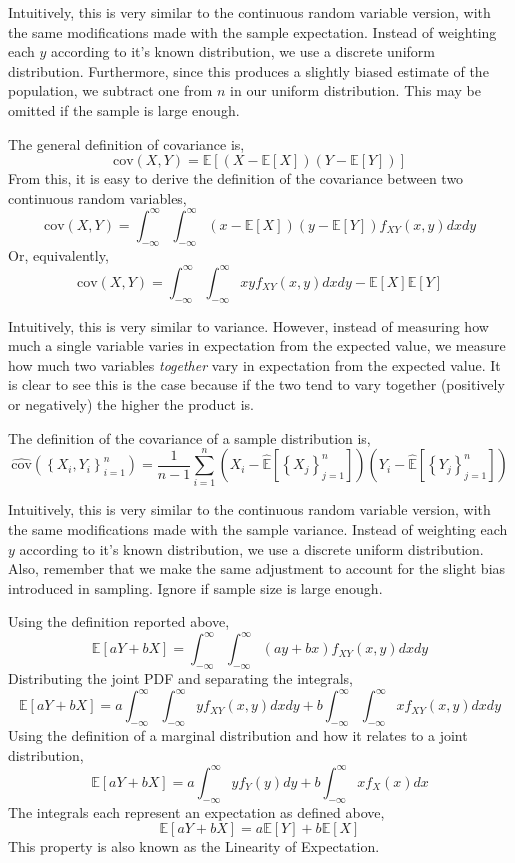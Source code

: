 \documentclass[12pt,twoside]{article}
\begin{document}
\begin{problems}
\begin{problemparts}
Intuitively, this is very similar to the continuous random variable version,
with the same modifications made with the sample expectation. Instead of weighting
each $y$ according to it's known distribution, we use a discrete uniform 
distribution. Furthermore, since this produces a slightly biased estimate of the
population, we subtract one from $n$ in our uniform distribution. This may be
omitted if the sample is large enough.

\problempart %

The general definition of covariance is,
$$ \mathrm{cov}(X, Y) = \mathbb{E}\left[\left(X - \mathbb{E}[X]\right)\left(Y - 
\mathbb{E}[Y]\right)\right] $$
From this, it is easy to derive the definition of the covariance between two
continuous random variables,
$$ \mathrm{cov}(X, Y) = \int_{-\infty}^{\infty} \int_{-\infty}^{\infty} \left(x
- \mathbb{E}[X]\right) \left(y - \mathbb{E}[Y]\right) f_{XY}(x, y) dx dy $$
Or, equivalently,
$$ \boxed{\mathrm{cov}(X, Y) = \int_{-\infty}^{\infty} \int_{-\infty}^{\infty} x y 
f_{XY}(x, y) dx dy - \mathbb{E}[X] \mathbb{E}[Y]} $$

Intuitively, this is very similar to variance. However, instead of measuring how
much a single variable varies in expectation from the expected value, we measure
how much two variables \textit{together} vary in expectation from the expected
value. It is clear to see this is the case because if the two tend to vary
together (positively or negatively) the higher the product is.

\problempart %

The definition of the covariance of a sample distribution is,
$$ \boxed{\hat{\mathrm{cov}}(\left\{X_i, Y_i\right\}_{i = 1}^n) = \frac{1}{n - 1} 
\sum_{i = 1}^{n} \left(X_i - \hat{\mathbb{E}}\left[\left\{X_j\right\}_{j =
1}^n\right]\right) \left(Y_i - \hat{\mathbb{E}}\left[\left\{Y_j\right\}_{j = 
1}^n\right]\right)} $$

Intuitively, this is very similar to the continuous random variable version,
with the same modifications made with the sample variance. Instead of weighting
each $y$ according to it's known distribution, we use a discrete uniform
distribution. Also, remember that we make the same adjustment to account for the
slight bias introduced in sampling. Ignore if sample size is large enough.

\problempart %

Using the definition reported above,
$$ \mathbb{E}[aY + bX] = \int_{-\infty}^{\infty} \int_{-\infty}^{\infty} \left(
ay + bx\right) f_{XY}(x, y) dx dy $$
Distributing the joint PDF and separating the integrals,
$$ \mathbb{E}[aY + bX] = a \int_{-\infty}^{\infty} \int_{-\infty}^{\infty} y
f_{XY}(x, y) dx dy + b \int_{-\infty}^{\infty} \int_{-\infty}^{\infty} x
f_{XY}(x, y) dx dy$$
Using the definition of a marginal distribution and how it relates to a joint
distribution,
$$ \mathbb{E}[aY + bX] = a \int_{-\infty}^{\infty} y f_{Y}(y) dy + b 
\int_{-\infty}^{\infty} x f_{X}(x) dx $$
The integrals each represent an expectation as defined above,
$$ \boxed{\mathbb{E}[aY + bX] = a \mathbb{E}[Y] + b \mathbb{E}[X]} $$
This property is also known as the Linearity of Expectation.


\end{problemparts}
\end{problems}
\end{document}
